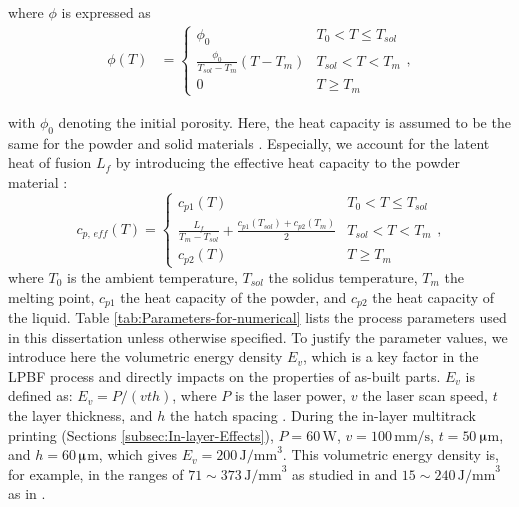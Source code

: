 \documentclass [11pt, proquest] {uwthesis}[2020/02/24]
\begin{document}
\noindent where $\phi$ is expressed as
\begin{align*}
\phi(T) & =\begin{cases}
\phi_{0} & T_{0}<T\leq T_{sol}\\
\frac{\phi_{0}}{T_{sol}-T_{m}}(T-T_{m}) & T_{sol}<T<T_{m}\\
0 & T\geq T_{m}
\end{cases},
\end{align*}

\noindent with $\phi_{0}$ denoting the initial porosity. Here, the
heat capacity is assumed to be the same for the powder and solid materials
\cite{karayagiz2019numerical}. Especially, we account for the latent
heat of fusion $L_{f}$ by introducing the effective heat capacity
to the powder material \cite{Yadroitsev2009}:
\begin{equation}
c_{p,\,eff}(T)=\begin{cases}
c_{p1}(T) & T_{0}<T\leq T_{sol}\\
\frac{L_{f}}{T_{m}-T_{sol}}+\frac{c_{p1}(T_{sol})+c_{p2}(T_{m})}{2} & T_{sol}<T<T_{m}\\
c_{p2}(T) & T\geq T_{m}
\end{cases},\label{eq:effective_heat_cap}
\end{equation}
\noindent where $T_{0}$ is the ambient temperature, $T_{sol}$ the solidus
temperature, $T_{m}$ the melting point, $c_{p1}$ the heat capacity
of the powder, and $c_{p2}$ the heat capacity of the liquid. Table
\ref{tab:Parameters-for-numerical} lists the process parameters used
in this dissertation unless otherwise specified. To justify the parameter
values, we introduce here the volumetric energy density $E_{v}$,
which is a key factor in the LPBF process and directly impacts on the
properties of as-built parts. $E_{v}$ is defined as: $E_{v}=P/\left(vth\right)$,
where $P$ is the laser power, $v$ the laser scan speed, $t$ the
layer thickness, and $h$ the hatch spacing \cite{cepeda2020effect}.
During the in-layer multitrack printing (Sections \ref{subsec:In-layer-Effects}), $P=60\,\mathrm{W}$, $v=100\,\mathrm{mm/s}$,
$t=50\,$$\muup$m, and $h=60\,$$\muup$m, which gives $E_{v}=200\,\mathrm{J/mm}^{3}$.
This volumetric energy density is, for example, in the ranges of $71\sim373\,\mathrm{J/mm}^{3}$
as studied in \cite{thijs2010study} and $15\sim240\,\mathrm{J/mm}^{3}$
as in \cite{majumdar2019understanding}.
\end{document}
